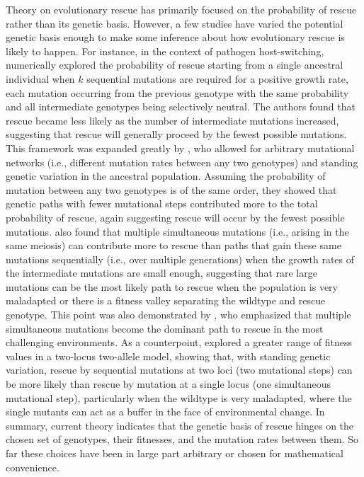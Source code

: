 \documentclass[9pt,twocolumn,twoside,lineno]{gsajnl}
\begin{document}
Theory on evolutionary rescue \citep[reviewed in][]{Alexander2014} has primarily focused on the probability of rescue rather than its genetic basis.
However, a few studies have varied the potential genetic basis enough to make some inference about how evolutionary rescue is likely to happen.
For instance, in the context of pathogen host-switching, \cite{Antia2003} numerically explored the probability of rescue starting from a single ancestral individual when $k$ sequential mutations are required for a positive growth rate, each mutation occurring from the previous genotype with the same probability and all intermediate genotypes being selectively neutral.
The authors found that rescue became less likely as the number of intermediate mutations increased, suggesting that rescue will generally proceed by the fewest possible mutations.
This framework was expanded greatly by \cite{Iwasa2004}, who allowed for arbitrary mutational networks (i.e., different mutation rates between any two genotypes) and standing genetic variation in the ancestral population.
Assuming the probability of mutation between any two genotypes is of the same order, they showed that genetic paths with fewer mutational steps contributed more to the total probability of rescue, again suggesting rescue will occur by the fewest possible mutations.
\cite{Iwasa2004} also found that multiple simultaneous mutations (i.e., arising in the same meiosis) can contribute more to rescue than paths that gain these same mutations sequentially (i.e., over multiple generations) when the growth rates of the intermediate mutations are small enough, suggesting that rare large mutations can be the most likely path to rescue when the population is very maladapted or there is a fitness valley separating the wildtype and rescue genotype.    
This point was also demonstrated by \cite{Alexander2010}, who emphasized that multiple simultaneous mutations become the dominant path to rescue in the most challenging environments. 
As a counterpoint, \cite{Uecker2016} explored a greater range of fitness values in a two-locus two-allele model, showing that, with standing genetic variation, rescue by sequential mutations at two loci (two mutational steps) can be more likely than rescue by mutation at a single locus (one simultaneous mutational step), particularly when the wildtype is very maladapted, where the single mutants can act as a buffer in the face of environmental change. 
In summary, current theory indicates that the genetic basis of rescue hinges on the chosen set of genotypes, their fitnesses, and the mutation rates between them. 
So far these choices have been in large part arbitrary or chosen for mathematical convenience.
\end{document}
